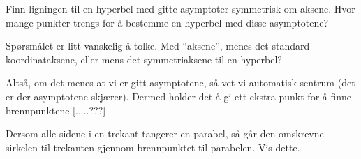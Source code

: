 \documentclass[11pt, norsk]{article}
\begin{document}
\begin{oppg}
  Finn ligningen til en hyperbel med gitte asymptoter symmetrisk om aksene. Hvor mange punkter trengs for å bestemme en hyperbel med disse asymptotene?
\end{oppg}
\begin{losn}
 Spørsmålet er litt vanskelig å tolke. Med ``aksene'', menes det standard koordinataksene, eller mens det symmetriaksene til en hyperbel? 

Altså, om det menes at vi er gitt asymptotene, så vet vi automatisk sentrum (det er der asymptotene skjærer). Dermed holder det å gi ett ekstra punkt for å finne brennpunktene [.....???]
\end{losn}

\begin{oppg}
 Dersom alle sidene i en trekant tangerer en parabel, så går den omskrevne sirkelen til trekanten gjennom brennpunktet til parabelen. Vis dette.
\end{oppg}
\begin{losn}

\end{losn}
\end{document}
